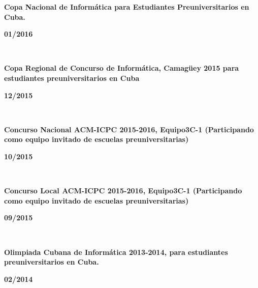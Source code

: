 \documentclass{article}
\begin{document}
\begin{minipage}{0.8\textwidth}
\parbox{0.8\linewidth}{\textbf{Copa Nacional de Informática para Estudiantes Preuniversitarios en Cuba.}} \hfill \textbf{01/2016}\
\
\end{minipage}\
\begin{minipage}{0.8\textwidth}
\parbox{0.8\linewidth}{\textbf{Copa Regional de Concurso de Informática, Camagüey 2015 para estudiantes preuniversitarios en Cuba}} \hfill \textbf{12/2015}\
\
\end{minipage}\
\begin{minipage}{0.8\textwidth}
\parbox{0.8\linewidth}{\textbf{Concurso Nacional ACM-ICPC 2015-2016, Equipo3C-1 (Participando como equipo invitado de escuelas preuniversitarias)}} \hfill \textbf{10/2015}\
\
\end{minipage}\
\begin{minipage}{0.8\textwidth}
\parbox{0.8\linewidth}{\textbf{Concurso Local ACM-ICPC 2015-2016, Equipo3C-1 (Participando como equipo invitado de escuelas preuniversitarias)}} \hfill \textbf{09/2015}\
\
\end{minipage}\
\begin{minipage}{0.8\textwidth}
\parbox{0.8\linewidth}{\textbf{Olimpiada Cubana de Informática 2013-2014, para estudiantes preuniversitarios en Cuba.}} \hfill \textbf{02/2014}\
\
\end{minipage}\
\end{document}
